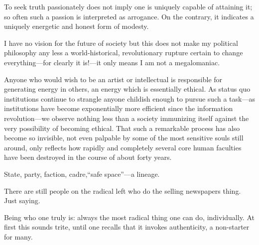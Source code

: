 \documentclass[12pt, twocolumn, oneside]{article}  	%
\begin{document}
\newpage

\setcounter{page}{2}
\renewcommand{\thepage}{\arabic{page}}

To seek truth passionately does not imply one is uniquely capable of attaining it; so often such a passion is interpreted as arrogance. On the contrary, it indicates a uniquely energetic and honest form of modesty.

\vspace{3em}

I have no vision for the future of society but this does not make my political philosophy any less a world-historical, revolutionary rupture certain to change everything---for clearly it is!---it only means I am not a megalomaniac.

\vspace{3em}

Anyone who would wish to be an artist or intellectual is responsible for generating energy in others, an energy which is essentially ethical. As status quo institutions continue to strangle anyone childish enough to pursue such a task---as institutions have become exponentially more efficient since the information revolution---we observe nothing less than a society immunizing itself against the very possibility of becoming ethical. That such a remarkable process has also become so invisible, not even palpable by some of the most sensitive souls still around, only reflects how rapidly and completely several core human faculties have been destroyed in the course of about forty years.



\newpage


State, party, faction, cadre,``safe space''---a lineage.

\vspace{3em}

There are still people on the radical left who do the selling newspapers thing. Just saying.

\vspace{3em}

Being who one truly is: always the most radical thing one can do, individually. At first this sounds trite, until one recalls that it invokes authenticity, a non-starter for many.
\end{document}
